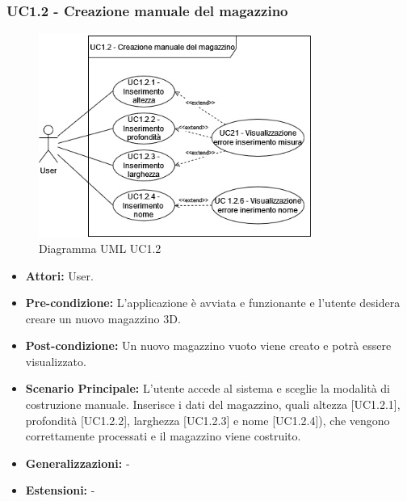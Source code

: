 \subsubsection{UC1.2 - Creazione manuale del magazzino}
\begin{figure}[H]
    \centering
    \includegraphics[width=0.8\textwidth]{UC_diagrams_1-10/UC1.2.drawio.png}
    \caption{Diagramma UML UC1.2}
\end{figure}
\begin{itemize}
    \item \textbf{Attori:} User.
    \item \textbf{Pre-condizione:} L'applicazione è avviata e funzionante e l'utente desidera creare un nuovo magazzino 3D.
    \item \textbf{Post-condizione:} Un nuovo magazzino vuoto viene creato e potrà essere visualizzato.
    \item \textbf{Scenario Principale:}  L’utente accede al sistema e sceglie la modalità di costruzione manuale. Inserisce i dati del magazzino, quali altezza [UC1.2.1], profondità [UC1.2.2], larghezza [UC1.2.3] e nome [UC1.2.4]), che vengono correttamente processati e il magazzino viene costruito.
    \item \textbf{Generalizzazioni:} -
    \item \textbf{Estensioni:} -
\end{itemize}


